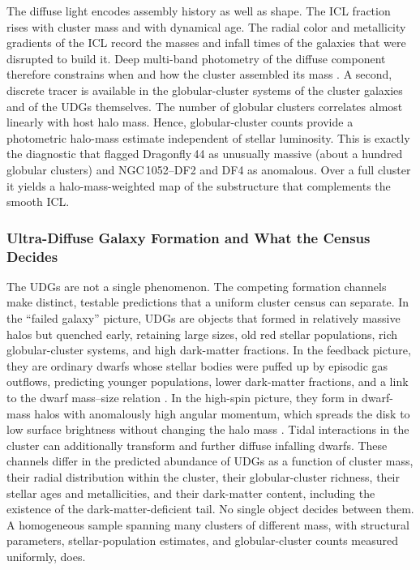 \documentclass[10pt,onecolumn]{article}
\begin{document}
The diffuse light encodes assembly history as well as shape. The ICL fraction rises with cluster mass and with dynamical age. The radial color and metallicity gradients of the ICL record the masses and infall times of the galaxies that were disrupted to build it. Deep multi-band photometry of the diffuse component therefore constrains when and how the cluster assembled its mass \cite{montes2022review}. A second, discrete tracer is available in the globular-cluster systems of the cluster galaxies and of the UDGs themselves. The number of globular clusters correlates almost linearly with host halo mass. Hence, globular-cluster counts provide a photometric halo-mass estimate independent of stellar luminosity. This is exactly the diagnostic that flagged Dragonfly\,44 as unusually massive (about a hundred globular clusters) and NGC\,1052--DF2 and DF4 as anomalous. Over a full cluster it yields a halo-mass-weighted map of the substructure that complements the smooth ICL.

\subsubsection{Ultra-Diffuse Galaxy Formation and What the Census Decides}

The UDGs are not a single phenomenon. The competing formation channels make distinct, testable predictions that a uniform cluster census can separate. In the ``failed galaxy'' picture, UDGs are objects that formed in relatively massive halos but quenched early, retaining large sizes, old red stellar populations, rich globular-cluster systems, and high dark-matter fractions. In the feedback picture, they are ordinary dwarfs whose stellar bodies were puffed up by episodic gas outflows, predicting younger populations, lower dark-matter fractions, and a link to the dwarf mass--size relation \cite{dicintio2017}. In the high-spin picture, they form in dwarf-mass halos with anomalously high angular momentum, which spreads the disk to low surface brightness without changing the halo mass \cite{amorisco2016}. Tidal interactions in the cluster can additionally transform and further diffuse infalling dwarfs. These channels differ in the predicted abundance of UDGs as a function of cluster mass, their radial distribution within the cluster, their globular-cluster richness, their stellar ages and metallicities, and their dark-matter content, including the existence of the dark-matter-deficient tail. No single object decides between them. A homogeneous sample spanning many clusters of different mass, with structural parameters, stellar-population estimates, and globular-cluster counts measured uniformly, does.
\end{document}
